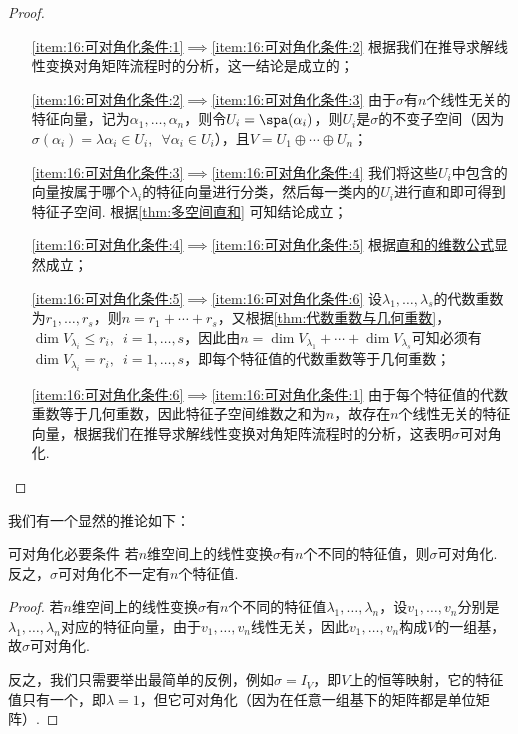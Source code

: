 \begin{proof}
    \begin{itemize}
        \item[\ref*{item:16:可对角化条件:1}$\implies$\ref*{item:16:可对角化条件:2}] 根据我们在推导求解线性变换对角矩阵流程时的分析，这一结论是成立的；

        \item[\ref*{item:16:可对角化条件:2}$\implies$\ref*{item:16:可对角化条件:3}] 由于$\sigma$有$n$个线性无关的特征向量，记为$\alpha_1,\ldots,\alpha_n$，则令$U_i=\spa(\alpha_i)$，则$U_i$是$\sigma$的不变子空间（因为$\sigma(\alpha_i)=\lambda\alpha_i\in U_i,\enspace\forall\alpha_i\in U_i$），且$V=U_1\oplus\cdots\oplus U_n$；

        \item[\ref*{item:16:可对角化条件:3}$\implies$\ref*{item:16:可对角化条件:4}] 我们将这些$U_i$中包含的向量按属于哪个$\lambda_i$的特征向量进行分类，然后每一类内的$U_i$进行直和即可得到特征子空间. 根据\autoref{thm:多空间直和} 可知结论成立；

        \item[\ref*{item:16:可对角化条件:4}$\implies$\ref*{item:16:可对角化条件:5}] 根据\hyperref[thm:直和等价命题]{直和的维数公式}显然成立；

        \item[\ref*{item:16:可对角化条件:5}$\implies$\ref*{item:16:可对角化条件:6}] 设$\lambda_1,\ldots,\lambda_s$的代数重数为$r_1,\ldots,r_s$，则$n=r_1+\cdots+r_s$，又根据\autoref{thm:代数重数与几何重数}，$\dim V_{\lambda_i}\leqslant r_i,\enspace i=1,\ldots,s$，因此由$n=\dim V_{\lambda_1}+\cdots+\dim V_{\lambda_s}$可知必须有$\dim V_{\lambda_i}=r_i,\enspace i=1,\ldots,s$，即每个特征值的代数重数等于几何重数；

        \item[\ref*{item:16:可对角化条件:6}$\implies$\ref*{item:16:可对角化条件:1}] 由于每个特征值的代数重数等于几何重数，因此特征子空间维数之和为$n$，故存在$n$个线性无关的特征向量，根据我们在推导求解线性变换对角矩阵流程时的分析，这表明$\sigma$可对角化.
    \end{itemize}
\end{proof}

我们有一个显然的推论如下：
\begin{corollary}{}{可对角化必要条件}
    若$n$维空间上的线性变换$\sigma$有$n$个不同的特征值，则$\sigma$可对角化. 反之，$\sigma$可对角化不一定有$n$个特征值.
\end{corollary}

\begin{proof}
    若$n$维空间上的线性变换$\sigma$有$n$个不同的特征值$\lambda_1,\ldots,\lambda_n$，设$v_1,\ldots,v_n$分别是$\lambda_1,\ldots,\lambda_n$对应的特征向量，由于$v_1,\ldots,v_n$线性无关，因此$v_1,\ldots,v_n$构成$V$的一组基，故$\sigma$可对角化.

    反之，我们只需要举出最简单的反例，例如$\sigma=I_V$，即$V$上的恒等映射，它的特征值只有一个，即$\lambda=1$，但它可对角化（因为在任意一组基下的矩阵都是单位矩阵）.
\end{proof}

